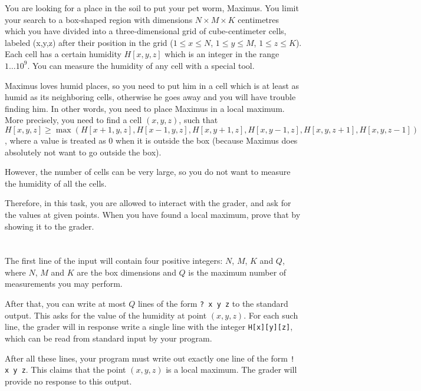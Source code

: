 \ifx\boi\undefined\fi
\def\version{jury-draft}

You are looking for a place in the soil to put your pet worm, Maximus. You limit your search to a box-shaped region with dimensions $N \times M \times K$ centimetres which you have divided into a three-dimensional grid of cube-centimeter cells, labeled (x,y,z) after their position in the grid ($1 \le x \le N$, $1 \le y \le M$, $1 \le z \le K$). Each cell has a certain humidity $H[x,y,z]$ which is an integer in the range $1 \dots 10^9$. You can measure the humidity of any cell with a special tool.  

Maximus loves humid places, so you need to put him in a cell which is at least as humid as its neighboring cells, otherwise he goes away and you will have trouble finding him. In other words, you need to place Maximus in a local maximum. More precisely, you need to find a cell $(x,y,z)$, such that $H[x,y,z] \ge \max(H[x+1, y, z], H[x-1,y,z], H[x,y+1,z], H[x,y-1,z],H[x,y,z+1],H[x,y,z-1] )$, where a value is treated as $0$ when it is outside the box (because Maximus does absolutely not want to go outside the box).

However, the number of cells can be very large, so you do not want to measure the humidity of all the cells.

Therefore, in this task, you are allowed to interact with the grader, and ask for the values at given points.
When you have found a local maximum, prove that by showing it to the grader. 

\section*{\interactivity}
The first line of the input will contain four positive integers: $N$, $M$, $K$ and $Q$, where $N$, $M$ and $K$ are the box dimensions and $Q$ is the maximum number of measurements you may perform.

After that, you can write at most $Q$ lines of the form \texttt{? x y z} to the standard output.
This asks for the value of the humidity at point $(x, y, z)$.
For each such line, the grader will in response write a single line with the integer \texttt{H[x][y][z]}, which can be read from standard input by your program.

After all these lines, your program must write out exactly one line of the form \texttt{! x y z}.
This claims that the point $(x, y, z)$ is a local maximum.
The grader will provide no response to this output.

